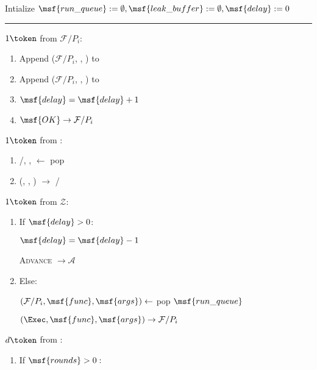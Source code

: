 \begin{bbox}[title={\textbf{Wrapper} $\Wasync$} ] 

Intialize $\msf{run\_queue} := \emptyset, \msf{leak\_buffer} := \emptyset, \msf{delay} := 0$

\vspace{2mm} \hrule \vspace{2mm}

\OnInput {} \color{red} $1 \token$ \color{black} from $\mathcal{F}/P_i$:
	\begin{enumerate}
		\item Append ($\mathcal{F}/P_i$, , ) to 
		\item Append ($\mathcal{F}/P_i$, , ) to 
		\item $\msf{delay} = \msf{delay} + 1$
		\item \Send $\msf{OK} \rightarrow \mathcal{F}/P_i$
	\end{enumerate}


\OnInput {} \color{red} $1 \token$ \color{black} from \Ag:
	\begin{enumerate}
		\item \F/\Partyi, ,  $\leftarrow$ pop 
		\item \Send (\Exec, , ) $\rightarrow$ \F/\Partyi
	\end{enumerate}

\OnInput {} \color{red} $1 \token$ \color{black} from $\mathcal{Z}$:
	\begin{enumerate}
		\item If $\msf{delay} > 0$:

			\quad  $\msf{delay} = \msf{delay} - 1$

			\quad  \Send \textsc{Advance} $\rightarrow \mathcal{A}$
		\item Else:
			
			\quad $(\mathcal{F}/P_i, \msf{func}, \msf{args}) \leftarrow$ pop $\msf{run\_queue}$

			\quad \Send $(\Exec, \msf{func}, \msf{args}) \rightarrow \mathcal{F}/P_i$
	\end{enumerate}

\OnInput {} \color{red} $d \token$ \color{black} from \Ag:
	\begin{enumerate}
		\item If $\msf{rounds} > 0:$


\end{enumerate}
\end{bbox}
